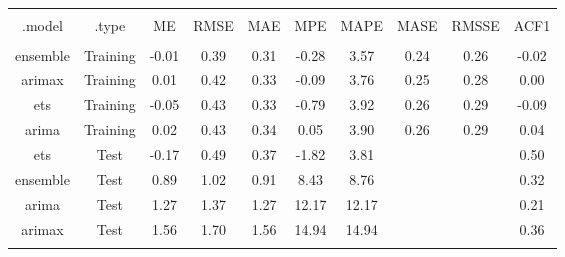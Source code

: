 
\begin{table}[!htbp] \centering 
  \caption{} 
  \label{} 
\begin{tabular}{@{\extracolsep{5pt}} cccccccccc} 
\\[-1.8ex]\hline 
\hline \\[-1.8ex] 
.model & .type & ME & RMSE & MAE & MPE & MAPE & MASE & RMSSE & ACF1 \\ 
\hline \\[-1.8ex] 
ensemble & Training & -0.01 & 0.39 & 0.31 & -0.28 &  3.57 & 0.24 & 0.26 & -0.02 \\ 
arimax & Training &  0.01 & 0.42 & 0.33 & -0.09 &  3.76 & 0.25 & 0.28 &  0.00 \\ 
ets & Training & -0.05 & 0.43 & 0.33 & -0.79 &  3.92 & 0.26 & 0.29 & -0.09 \\ 
arima & Training &  0.02 & 0.43 & 0.34 &  0.05 &  3.90 & 0.26 & 0.29 &  0.04 \\ 
ets & Test & -0.17 & 0.49 & 0.37 & -1.82 &  3.81 &  &  &  0.50 \\ 
ensemble & Test &  0.89 & 1.02 & 0.91 &  8.43 &  8.76 &  &  &  0.32 \\ 
arima & Test &  1.27 & 1.37 & 1.27 & 12.17 & 12.17 &  &  &  0.21 \\ 
arimax & Test &  1.56 & 1.70 & 1.56 & 14.94 & 14.94 &  &  &  0.36 \\ 
\hline \\[-1.8ex] 
\end{tabular} 
\end{table} 
